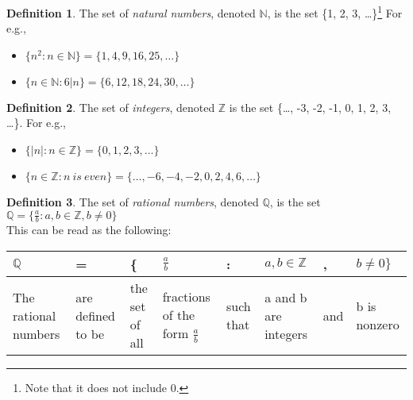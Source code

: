 \documentclass{amsart} %
\theoremstyle{definition} %
\newtheorem*{dfn}{Definition} %
\theoremstyle{definition}
\theoremstyle{remark} %
\begin{document}
\begin{dfn}
 \quad The set of \emph{natural numbers}, denoted $\mathbb{N}$, is the set \{1, 2, 3, \dots\}\footnote{Note that it does not include 0.} For e.g.,
    \begin{itemize}
          \item $\{n^2:n \in \mathbb{N} \} = \{1, 4, 9, 16, 25, \dots\}$
          \item $\{n \in \mathbb{N} : 6|n\} = \{6, 12, 18, 24, 30, \dots\}$
    \end{itemize}
\end{dfn}

\begin{dfn}
 \quad The set of \emph{integers}, denoted $\mathbb{Z}$ is the set \{\dots, -3, -2, -1, 0, 1, 2, 3, \dots \}. For e.g.,
    \begin{itemize}
          \item $\{|n|:n \in \mathbb{Z} \} = \{0, 1, 2, 3, \dots\}$
          \item $\{n \in \mathbb{Z}: n\ is\ even\} = \{\dots, -6, -4, -2, 0, 2, 4, 6, \dots \}$ %
    \end{itemize}
\end{dfn}

\begin{dfn}
 \quad The set of \emph{rational numbers}, denoted $\mathbb{Q}$, is the set $\mathbb{Q} = \{\frac{a}{b}: a,b \in \mathbb{Z}, b \neq 0 \}$ \\
This can be read as the following:
    \begin{center}
    \begin{tabularx}{0.95\textwidth}{ %
      | >{\centering\arraybackslash}X %
      | >{\centering\arraybackslash}X
      | >{\centering\arraybackslash}X
      | >{\centering\arraybackslash}X
      | >{\centering\arraybackslash}X
      | >{\centering\arraybackslash}X
      | >{\centering\arraybackslash}X
      | >{\centering\arraybackslash}X | }
      $\mathbb{Q}$ & = & \{ & $\frac{a}{b}$ & : & $a,b \in \mathbb{Z}$ & , & $b \neq 0\}$ \\
      \hline
      The rational numbers & are defined to be & the set of all & fractions of the form $\frac{a}{b}$ & such that & a and b are integers & and & b is nonzero \\
    \end{tabularx}
    \end{center}
\end{dfn}
\end{document}

